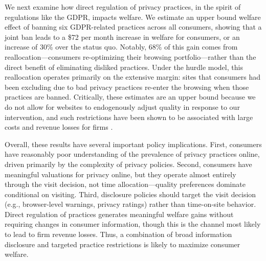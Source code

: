 \documentclass[12pt]{article}
\theoremstyle{definition}
\theoremstyle{remark}
\begin{document}
We next examine how direct regulation of privacy practices, in the spirit of regulations like the GDPR, impacts welfare. We estimate an upper bound welfare effect of banning six GDPR-related practices across all consumers, showing that a joint ban leads to a \$72 per month increase in welfare for consumers, or an increase of 30\% over the status quo. %
Notably, 68\% of this gain comes from reallocation---consumers re-optimizing their browsing portfolio---rather than the direct benefit of eliminating disliked practices. %
Under the hurdle model, this reallocation operates primarily on the extensive margin: sites that consumers had been excluding due to bad privacy practices re-enter the browsing when those practices are banned. Critically, these estimates are an upper bound because we do not allow for websites to endogenously adjust quality in response to our intervention, and such restrictions have been shown to be associated with large costs and revenue losses for firms \citep{goldberg2023regulating, aridor2023effect, aridor2024privacy}.

Overall, these results have several important policy implications. First, consumers have reasonably poor understanding of the prevalence of privacy practices online, driven primarily by the complexity of privacy policies. Second, consumers have meaningful valuations for privacy online, but they operate almost entirely through the visit decision, not time allocation---quality preferences dominate conditional on visiting. Third, disclosure policies should target the visit decision (e.g., browser-level warnings, privacy ratings) rather than time-on-site behavior. Direct regulation of practices generates meaningful welfare gains without requiring changes in consumer information, though this is the channel most likely to lead to firm revenue losses. Thus, a combination of broad information disclosure and targeted practice restrictions is likely to maximize consumer welfare.
\end{document}

